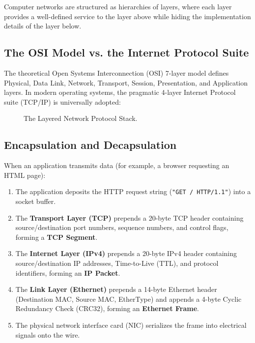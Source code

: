 Computer networks are structured as hierarchies of layers, where each layer provides a well-defined service to the layer above while hiding the implementation details of the layer below.

\subsection{The OSI Model vs. the Internet Protocol Suite}
The theoretical Open Systems Interconnection (OSI) 7-layer model defines Physical, Data Link, Network, Transport, Session, Presentation, and Application layers. In modern operating systems, the pragmatic 4-layer Internet Protocol suite (TCP/IP) is universally adopted:

\begin{figure}[htbp]
\centering
{}
\caption{The Layered Network Protocol Stack.}
\label{fig:net_layers}
\end{figure}

\subsection{Encapsulation and Decapsulation}
When an application transmits data (for example, a browser requesting an HTML page):
\begin{enumerate}
    \item The application deposits the HTTP request string (\texttt{"GET / HTTP/1.1"}) into a socket buffer.
    \item The \textbf{Transport Layer (TCP)} prepends a 20-byte TCP header containing source/destination port numbers, sequence numbers, and control flags, forming a \textbf{TCP Segment}.
    \item The \textbf{Internet Layer (IPv4)} prepends a 20-byte IPv4 header containing source/destination IP addresses, Time-to-Live (TTL), and protocol identifiers, forming an \textbf{IP Packet}.
    \item The \textbf{Link Layer (Ethernet)} prepends a 14-byte Ethernet header (Destination MAC, Source MAC, EtherType) and appends a 4-byte Cyclic Redundancy Check (CRC32), forming an \textbf{Ethernet Frame}.
    \item The physical network interface card (NIC) serializes the frame into electrical signals onto the wire.
\end{enumerate}

